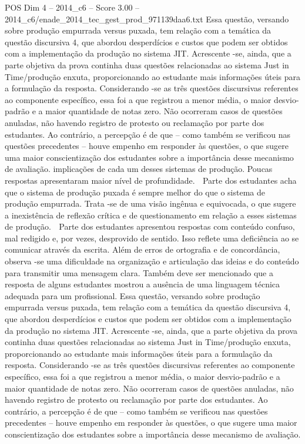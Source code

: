 \begin{textsample}{POS Dim 4 – 2014\_c6 – Score 3.00 – 2014\_c6/enade\_2014\_tec\_gest\_prod\_971139daa6.txt}
Essa questão, versando sobre produção empurrada versus puxada, tem relação com a temática da questão discursiva 4, que abordou desperdícios e custos que podem ser obtidos com a implementação da produção no sistema JIT.
Acrescente -se, ainda, que a parte objetiva da prova continha duas questões relacionadas ao sistema Just in Time/produção enxuta, proporcionando ao estudante mais informações úteis para a formulação da resposta.
Considerando -se as três questões discursivas referentes ao componente específico, essa foi a que registrou a menor média, o maior desvio-padrão e a maior quantidade de notas zero.
Não ocorreram casos de questões anuladas, não havendo registro de protesto ou reclamação por parte dos estudantes.
Ao contrário, a percepção é de que – como também se verificou nas questões precedentes – houve empenho em responder às questões, o que sugere uma maior conscientização dos estudantes sobre a importância desse mecanismo de avaliação. implicações de cada um desses sistemas de produção.
Poucas respostas apresentaram maior nível de profundidade.  Parte dos estudantes acha que o sistema de produção puxada é sempre melhor do que o sistema de produção empurrada.
Trata -se de uma visão ingênua e equivocada, o que sugere a inexistência de reflexão crítica e de questionamento em relação a esses sistemas de produção.  Parte dos estudantes apresentou respostas com conteúdo confuso, mal redigido e, por vezes, desprovido de sentido.
Isso reflete uma deficiência ao se comunicar através da escrita.
Além de erros de ortografia e de concordância, observa -se uma dificuldade na organização e articulação das ideias e do conteúdo para transmitir uma mensagem clara.
Também deve ser mencionado que a resposta de alguns estudantes mostrou a ausência de uma linguagem técnica adequada para um profissional.
Essa questão, versando sobre produção empurrada versus puxada, tem relação com a temática da questão discursiva 4, que abordou desperdícios e custos que podem ser obtidos com a implementação da produção no sistema JIT.
Acrescente -se, ainda, que a parte objetiva da prova continha duas questões relacionadas ao sistema Just in Time/produção enxuta, proporcionando ao estudante mais informações úteis para a formulação da resposta.
Considerando -se as três questões discursivas referentes ao componente específico, essa foi a que registrou a menor média, o maior desvio-padrão e a maior quantidade de notas zero.
Não ocorreram casos de questões anuladas, não havendo registro de protesto ou reclamação por parte dos estudantes.
Ao contrário, a percepção é de que – como também se verificou nas questões precedentes – houve empenho em responder às questões, o que sugere uma maior conscientização dos estudantes sobre a importância desse mecanismo de avaliação.

\end{textsample}
